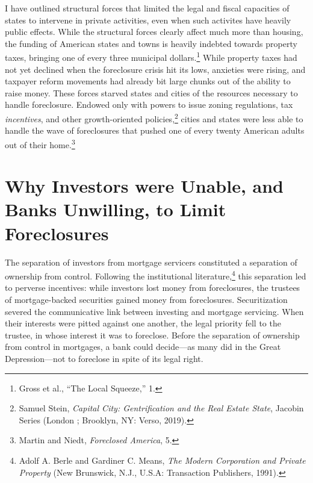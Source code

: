 \documentclass[12pt,oneside]{psthesis}
\begin{document}
I have outlined structural forces that limited the legal and fiscal capacities of states to intervene in private activities, even when such activites have heavily public effects.
While the structural forces clearly affect much more than housing, the funding of American states and towns is heavily indebted towards property taxes, bringing one of every three municipal dollars.\footnote{Gross et al., ``The Local Squeeze,'' 1.}
While property taxes had not yet declined when the foreclosure crisis hit its lows, anxieties were rising, and taxpayer reform movements had already bit large chunks out of the ability to raise money.
These forces starved states and cities of the resources necessary to handle foreclosure.
Endowed only with powers to issue zoning regulations, tax \emph{incentives}, and other growth-oriented policies,\footnote{Samuel Stein, \emph{Capital City: Gentrification and the Real Estate State}, Jacobin Series (London ; Brooklyn, NY: Verso, 2019).} cities and states were less able to handle the wave of foreclosures that pushed one of every twenty American adults out of their home.\footnote{Martin and Niedt, \emph{Foreclosed America}, 5.}

\hypertarget{banks}{%
\section{Why Investors were Unable, and Banks Unwilling, to Limit Foreclosures}\label{banks}}

The separation of investors from mortgage servicers constituted a separation of ownership from control.
Following the institutional literature,\footnote{Adolf A. Berle and Gardiner C. Means, \emph{The Modern Corporation and Private Property} (New Brunswick, N.J., U.S.A: Transaction Publishers, 1991).} this separation led to perverse incentives: while investors lost money from foreclosures, the trustees of mortgage-backed securities gained money from foreclosures.
Securitization severed the communicative link between investing and mortgage servicing.
When their interests were pitted against one another, the legal priority fell to the trustee, in whose interest it was to foreclose.
Before the separation of ownership from control in mortgages, a bank could decide---as many did in the Great Depression---not to foreclose in spite of its legal right.
\end{document}
